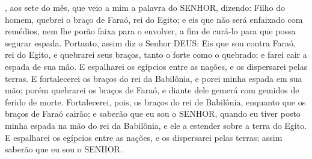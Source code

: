 {{},  aos sete do mês, que veio a mim a palavra do SENHOR, dizendo:
  Filho do homem, quebrei o braço de Faraó, rei do Egito; e eis que não será enfaixado com remédios, nem lhe porão faixa para o envolver, a fim de curá-lo para que possa segurar espada.
  Portanto, assim diz o Senhor DEUS: Eis que sou contra Faraó, rei do Egito, e quebrarei seus braços, tanto o forte como o quebrado; e farei cair a espada de sua mão.
  E espalharei os egípcios entre as nações, e os dispersarei pelas terras.
  E fortalecerei os braços do rei da Babilônia, e porei minha espada em sua mão; porém quebrarei os braços de Faraó, e diante dele gemerá com gemidos de ferido de morte.
  Fortalecerei, pois, os braços do rei de Babilônia, enquanto que os braços de Faraó cairão; e saberão que eu sou o SENHOR, quando eu tiver posto minha espada na mão do rei da Babilônia, e ele a estender sobre a terra do Egito.
  E espalharei os egípcios entre as nações, e os dispersarei pelas terras; assim saberão que eu sou o SENHOR.
\par }

